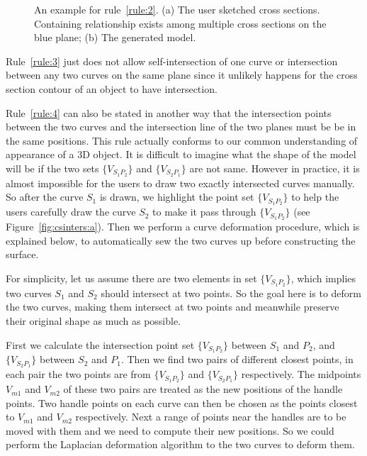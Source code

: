 \begin{figure} [htbp]
{\begin{minipage}[b]{0.22\textwidth}
    \end{minipage}}
  \caption{An example for rule~\ref{rule:2}. (a) The user sketched cross sections. Containing relationship exists among multiple cross sections on the blue plane; (b) The generated model.}
  \label{fig:rule2} %
\end{figure}

Rule~\ref{rule:3} just does not allow self-intersection of one
curve or intersection between any two curves on the same plane since
it unlikely happens for the cross section contour of an object to
have intersection.

Rule~\ref{rule:4} can also be stated in another way that the
intersection points between the two curves and the intersection line
of the two planes must be be in the same positions. This rule
actually conforms to our common understanding of appearance of a 3D
object. It is difficult to imagine what the shape of the model will
be if the two sets $\{V_{S_1P_2}\}$ and $\{V_{S_2P_1}\}$ are not
same. However in practice, it is almost impossible for the users to
draw two exactly intersected curves manually. So after the curve
$S_1$ is drawn, we highlight the point set $\{V_{S_1P_2}\}$ to help
the users carefully draw the curve $S_2$ to make it pass through
$\{V_{S_1P_2}\}$ (see Figure~\ref{fig:csinters:a}). Then we perform
a curve deformation procedure, which is explained below, to
automatically sew the two curves up before constructing the surface.

For simplicity, let us assume there are two elements  in set
$\{V_{S_1P_2}\}$, which implies two curves $S_1$ and $S_2$ should
intersect at two points. So the goal here is to deform the two
curves, making them intersect at two points and meanwhile preserve
their original shape as much as possible.

First we calculate the intersection point set  $\{V_{S_1P_2}\}$
between $S_1$ and $P_2$, and $\{V_{S_2P_1}\}$ between $S_2$ and
$P_1$. Then we find two pairs of different closest points, in each
pair the two points are from $\{V_{S_1P_2}\}$ and $\{V_{S_2P_1}\}$
respectively. The midpoints $V_{m1}$ and $V_{m2}$ of these two pairs
are treated as the new positions of the handle points. Two handle
points on each curve can then be chosen as the points closest to
$V_{m1}$ and $V_{m2}$ respectively. Next a range of points near the
handles are to be moved with them and we need to compute their new
positions. So we could perform the Laplacian deformation algorithm
to the two curves to deform them. 

